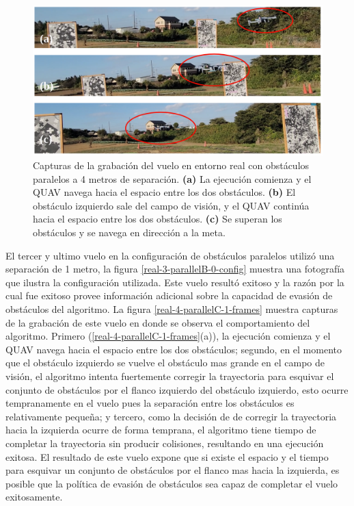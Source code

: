 \begin{figure}[H]
    \centering
    \includegraphics[scale=0.25]{partes/ImgJoao/real-3-parallelB-1-frames.png}
    \caption[Capturas de la grabación del vuelo en entorno real con obstáculos paralelos a 4 metros de separación.]{Capturas de la grabación del vuelo en entorno real con obstáculos paralelos a 4 metros de separación. \textbf{(a)} La ejecución comienza y el QUAV navega hacia el espacio entre los dos obstáculos. \textbf{(b)} El obstáculo izquierdo sale del campo de visión, y el QUAV continúa hacia el espacio entre los dos obstáculos. \textbf{(c)}  Se superan los obstáculos y se navega en dirección a la meta.}
    \label{real-3-parallelB-1-frames}
\end{figure}

El tercer y ultimo vuelo en la configuración de obstáculos paralelos utilizó una separación de 1 metro, la figura \ref{real-3-parallelB-0-config} muestra una fotografía que ilustra la configuración utilizada. Este vuelo resultó exitoso y la razón por la cual fue exitoso provee información adicional sobre la capacidad de evasión de obstáculos del algoritmo. La figura \ref{real-4-parallelC-1-frames} muestra capturas de la grabación de este vuelo en donde se observa el comportamiento del algoritmo. Primero (\ref{real-4-parallelC-1-frames}(a)), la ejecución comienza y el QUAV navega hacia el espacio entre los dos obstáculos; segundo, en el momento que el obstáculo izquierdo se vuelve el obstáculo mas grande en el campo de visión, el algoritmo intenta fuertemente corregir la trayectoria para esquivar el conjunto de obstáculos por el flanco izquierdo del obstáculo izquierdo, esto ocurre tempranamente en el vuelo pues la separación entre los obstáculos es relativamente pequeña; y tercero, como la decisión de de corregir la trayectoria hacia la izquierda ocurre de forma temprana, el algoritmo tiene tiempo de completar la trayectoria sin producir colisiones, resultando en una ejecución exitosa. El resultado de este vuelo expone que si existe el espacio y el tiempo para esquivar un conjunto de obstáculos por el flanco mas hacia la izquierda, es posible que la política de evasión de obstáculos sea capaz de completar el vuelo exitosamente.

